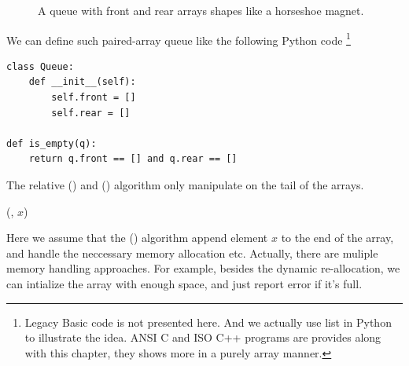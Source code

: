 \documentclass{article}
\begin{document}
\begin{figure}[htbp]
  \centering
  \caption{A queue with front and rear arrays shapes like a horseshoe magnet.} \label{fig:horseshoe-array}
\end{figure}

We can define such paired-array queue like the following Python code \footnote{Legacy Basic
code is not presented here. And we actually use list in Python to illustrate the idea.
ANSI C and ISO C++ programs are provides along with this chapter, they shows more
in a purely array manner.}

\lstset{language=Python}
\begin{lstlisting}
class Queue:
    def __init__(self):
        self.front = []
        self.rear = []

def is_empty(q):
    return q.front == [] and q.rear == []
\end{lstlisting}

The relative () and () algorithm only manipulate
on the tail of the arrays.

\begin{algorithmic}
  \State {}(, $x$)
\EndFunction
\end{algorithmic}

Here we assume that the () algorithm append element $x$ to
the end of the array, and handle the neccessary memory allocation etc. Actually,
there are muliple memory handling approaches. For example, besides the 
dynamic re-allocation, we can intialize the array with enough space, and just 
report error if it's full.
\end{document}
